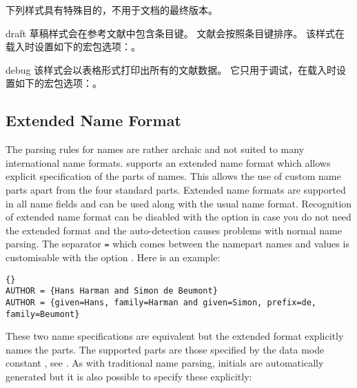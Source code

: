 下列样式具有特殊目的，不用于文档的最终版本。

\begin{marglist}

\item[draft]
草稿样式会在参考文献中包含条目键。
文献会按照条目键排序。
该样式在载入时设置如下的宏包选项：。

\item[debug]
该样式会以表格形式打印出所有的文献数据。
它只用于调试，在载入时设置如下的宏包选项：。

\end{marglist}

\subsection{Extended Name Format}
\label{use:enf}
The parsing rules for \bibtex names are rather archaic and not suited to
many international name formats. \biber supports an extended name format
which allows explicit specification of the parts of names. This allows the
use of custom name parts apart from the four standard \bibtex parts. Extended
name formats are supported in all name fields and can be used along with
the usual \bibtex name format. Recognition of extended name format can be
disabled with the \biber option  in case you do not need the
extended format and the auto-detection causes problems with normal name
parsing. The separator \verb+=+ which comes between the namepart names and
values is customisable with the \biber option . Here is an
example:

\begin{lstlisting}[style=bibtex]{}
AUTHOR = {Hans Harman and Simon de Beumont}
AUTHOR = {given=Hans, family=Harman and given=Simon, prefix=de, family=Beumont}
\end{lstlisting}
%
These two name specifications are equivalent but the extended format
explicitly names the parts. The supported parts are those specified by the
\biblatex data mode constant , see . As
with traditional \bibtex name parsing, initials are automatically generated
but it is also possible to specify these explicitly:

